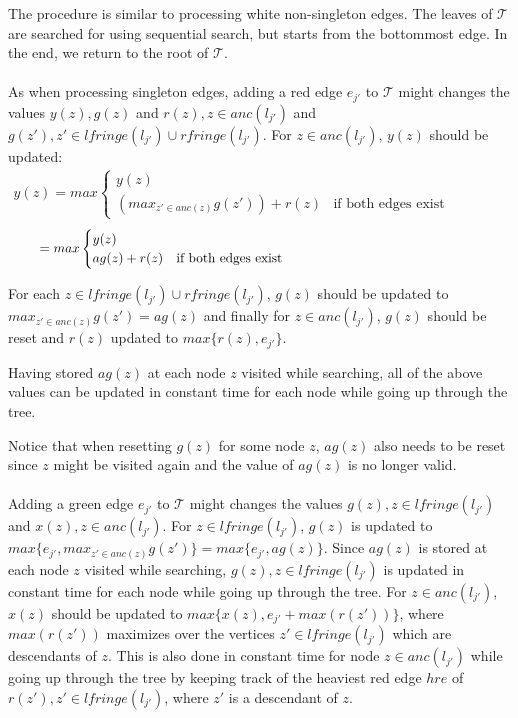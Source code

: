 The procedure is similar to processing white non-singleton edges. The leaves of $\mathcal{T}$ are searched for using sequential search, but starts from the bottommost edge. In the end, we return to the root of $\mathcal{T}$.
\\
\\
As when processing singleton edges, adding a red edge $e_{j'}$ to $\mathcal{T}$ might changes the values $y(z), g(z)$ and $r(z), z \in anc(l_{j'})$ and $g(z'), z' \in lfringe(l_{j'}) \cup rfringe(l_{j'})$. For $z \in anc(l_{j'})$, $y(z)$ should be updated:
\begin{equation*}
\begin{aligned}
y(z)=max
\begin{cases}
y(z)
\\
(max_{z' \in anc(z)} g(z')) + r(z) & \text{if both edges exist}             
\end{cases}
\end{aligned}
\phantom{\hspace{6cm}}
\end{equation*}
\begin{equation*}
\begin{aligned}
\hspace{0.8cm}=max
\begin{cases}
y(z)
\\
ag(z) + r(z) & \text{if both edges exist}             
\end{cases}
\end{aligned}
\phantom{\hspace{6cm}}
\end{equation*}

\noindent For each $z \in lfringe(l_{j'}) \cup rfringe(l_{j'})$, $g(z)$ should be updated to $max_{z' \in anc(z)} g(z') = ag(z)$ and finally for $z \in anc(l_{j'})$, $g(z)$ should be reset and $r(z)$ updated to $max\{r(z), e_{j'}\}$.

Having stored $ag(z)$ at each node $z$ visited while searching, all of the above values can be updated in constant time for each node while going up through the tree.

Notice that when resetting $g(z)$ for some node $z$, $ag(z)$ also needs to be reset since $z$ might be visited again and the value of $ag(z)$ is no longer valid.
\\
\\
Adding a green edge $e_{j'}$ to $\mathcal{T}$ might changes the values $g(z), z \in lfringe(l_{j'})$ and $x(z), z \in anc(l_{j'})$. For $z \in lfringe(l_{j'})$, $g(z)$ is updated to $max\{e_{j'}, max_{z' \in anc(z)} g(z')\} = max\{e_{j'}, ag(z)\}$. Since $ag(z)$ is stored at each node $z$ visited while searching, $g(z), z \in lfringe(l_{j'})$ is updated in constant time for each node while going up through the tree. For $z \in anc(l_{j'})$, $x(z)$ should be updated to $max\{x(z), e_{j'} + max(r(z'))\}$, where $max(r(z'))$ maximizes over the vertices $z' \in lfringe(l_{j'})$ which are descendants of $z$. This is also done in constant time for node $z \in anc(l_{j'})$ while going up through the tree by keeping track of the heaviest red edge $hre$ of $r(z'), z' \in lfringe(l_{j'})$, where $z'$ is a descendant of $z$.

